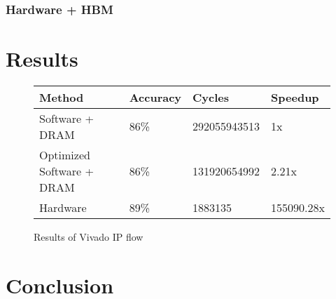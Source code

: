 \documentclass[conference,a4paper]{IEEEtran}[2015/08/26]
\begin{document}
\subsubsection{Hardware + HBM}

\section{Results}
\label{sec:results}

\begin{figure}
    \centering
    \begin{tabular}{l|lll}
      \toprule
      Method & Accuracy & Cycles & Speedup \\
      \midrule
      Software + DRAM   & 86\%  & 292055943513  & 1x    \\
      Optimized Software + DRAM   & 86\%  & 131920654992 & 2.21x     \\
      Hardware & 89\% & 1883135 & 155090.28x \\
      \bottomrule
    \end{tabular}
    \caption{Results of Vivado IP flow}
    \label{tab:ex:cref}
\end{figure}

\section{Conclusion}
\label{sec:conclusion}


\end{document}
